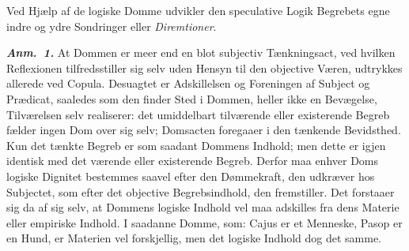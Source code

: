 \documentclass[12pt]{book}
\newcommand{\anm}[1]{\emph{\textbf{Anm.~#1.}}}
\begin{document}
Ved Hjælp af de logiske Domme udvikler den speculative Logik Begrebets egne
indre og ydre Sondringer eller \emph{Diremtioner}.

\anm{1} At Dommen er meer end en blot subjectiv Tænkningsact, ved hvilken
Reflexionen tilfredsstiller sig selv uden Hensyn til den objective Væren,
udtrykkes allerede ved Copula. Desuagtet er Adskillelsen og Foreningen af
Subject og Prædicat, saaledes som den finder Sted i Dommen, heller ikke en
Bevægelse, Tilværelsen selv realiserer: det umiddelbart tilværende eller
existerende Begreb fælder ingen Dom over sig selv; Domsacten foregaaer i den
tænkende Bevidsthed. Kun det tænkte Begreb er som saadant Dommens Indhold; men
dette er igjen identisk med det værende eller existerende Begreb. Derfor maa
enhver Doms logiske Dignitet bestemmes saavel efter den Dømmekraft, den udkræver
hos Subjectet, som efter det objective Begrebsindhold, den fremstiller. Det
forstaaer sig da af sig selv, at Dommens logiske Indhold vel maa adskilles fra
dens Materie eller empiriske Indhold. I saadanne Domme, som: Cajus er et
Menneske, Pasop er en Hund, er Materien vel forskjellig, men det logiske Indhold
dog det samme.
\end{document}
